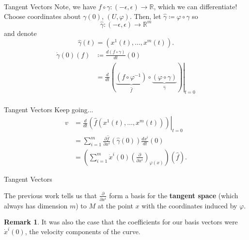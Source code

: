 \documentclass[usenames,dvipsnames]{beamer}
\theoremstyle{definition}
\newtheorem*{remark}{Remark}
\theoremstyle{theorem}
\newcommand{\R}{\mathbb{R}}
\begin{document}
        \begin{frame}{Tangent Vectors}
            Note, we have $f\circ \gamma \colon (-\epsilon, \epsilon)\to \R$, which we can differentiate! Choose coordinates about $\gamma(0)$, $(U,\varphi)$. Then, let $\hat{\gamma}\coloneqq \varphi\circ \gamma$ so
            \[
            \hat{\gamma} \colon (-\epsilon,\epsilon) \to \R^m
            \]
            and denote
            \[
            \hat{\gamma}(t)=(x^1(t),\dots,x^m(t)).
            \]
            \begin{align*}
                \dot{\gamma}(0)(f)&\coloneqq \frac{d(f\circ \gamma)}{dt}(0)\\
                &=\left.\frac{d}{dt}\left( \underbrace{(f\circ \varphi^{-1})}_{\hat{f}}\circ \underbrace{(\varphi\circ \gamma)}_{\hat{\gamma}}\right)\right|_{t=0}\\
            \end{align*}
        \end{frame}
        
        \begin{frame}{Tangent Vectors}
        Keep going...
            \begin{align*}
                v&=\left.\frac{d}{dt}\left( \hat{f}(x^1(t),\dots,x^m(t))\right)\right|_{t=0}\\
                &=\sum_{i=1}^m \frac{\partial \hat{f}}{\partial x^i}(\hat{\gamma}(0))\frac{dx^i}{dt}(0)\\
                &=\left( \sum_{i=1}^m \dot{x}^i(0)\left( \frac{\partial}{\partial x^i}\right)_{\varphi(x)}\right)(\hat{f}).
            \end{align*}
        \end{frame}
        
        \begin{frame}{Tangent Vectors}
            \begin{paragraph}
                The previous work tells us that $\frac{\partial}{\partial x^i}$ form a basis for the \textbf{tangent space} (which always has dimension $m$) to $M$ at the point $x$ with the coordinates induced by $\varphi$. 
            \end{paragraph}
            \begin{remark}
                It was also the case that the coefficients for our basis vectors were $\dot{x}^i(0)$, the velocity components of the curve.
            \end{remark}
        \end{frame}
        
\end{document}
